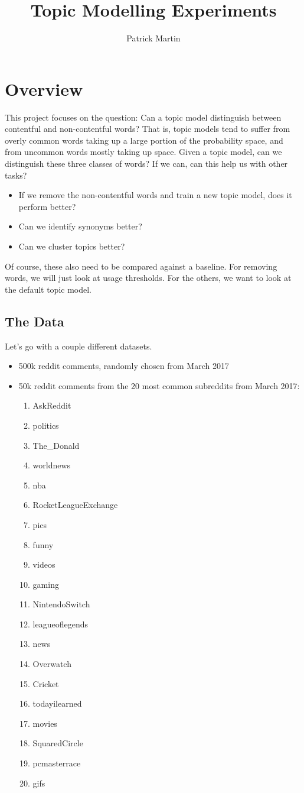 \documentclass[11pt]{article} %
\title{Topic Modelling Experiments}
\author{Patrick Martin}
\begin{document}
\maketitle

\section{Overview}

This project focuses on the question: Can a topic model distinguish between contentful and non-contentful words? That is, topic models tend to suffer from overly common words taking up a large portion of the probability space, and from uncommon words mostly taking up space. Given a topic model, can we distinguish these three classes of words? If we can, can this help us with other tasks?
\begin{itemize}
\item If we remove the non-contentful words and train a new topic model, does it perform better?
\item Can we identify synonyms better? 
\item Can we cluster topics better?
\end{itemize}


Of course, these also need to be compared against a baseline. For removing words, we will just look at usage thresholds. For the others, we want to look at the default topic model.
 \subsection{The Data}

Let's go with a couple different datasets.
\begin{itemize}
\item 500k reddit comments, randomly chosen from March 2017
\item 50k reddit comments from the 20 most common subreddits from March 2017:
\begin{enumerate}
\item AskReddit
\item politics
\item The\_Donald
\item worldnews
\item nba
\item RocketLeagueExchange
\item pics
\item funny
\item videos
\item gaming
\item NintendoSwitch
\item leagueoflegends
\item news
\item Overwatch
\item Cricket
\item todayilearned
\item movies
\item SquaredCircle
\item pcmasterrace
\item gifs
\end{enumerate}
\end{itemize}
\end{document}
